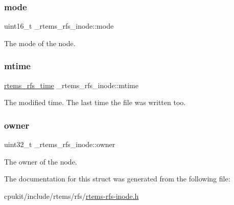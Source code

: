 \subsubsection{\texorpdfstring{mode}{mode}}
{\footnotesize\ttfamily uint16\+\_\+t \+\_\+rtems\+\_\+rfs\+\_\+inode\+::mode}

The mode of the node. \mbox{\label{struct__rtems__rfs__inode_aac67d1c3cf26098e0b62aac5bc906507}} 
\subsubsection{\texorpdfstring{mtime}{mtime}}
{\footnotesize\ttfamily \mbox{\hyperlink{rtems-rfs-inode_8h_a7877cc60240d76cccb89acaffdd20aa6}{rtems\+\_\+rfs\+\_\+time}} \+\_\+rtems\+\_\+rfs\+\_\+inode\+::mtime}

The modified time. The last time the file was written too. \mbox{\label{struct__rtems__rfs__inode_aa782e1cd255be914e47ba16e018a7f4d}} 
\subsubsection{\texorpdfstring{owner}{owner}}
{\footnotesize\ttfamily uint32\+\_\+t \+\_\+rtems\+\_\+rfs\+\_\+inode\+::owner}

The owner of the node. 

The documentation for this struct was generated from the following file\+:\begin{DoxyCompactItemize}
\item 
cpukit/include/rtems/rfs/\mbox{\hyperlink{rtems-rfs-inode_8h}{rtems-\/rfs-\/inode.\+h}}\end{DoxyCompactItemize}
